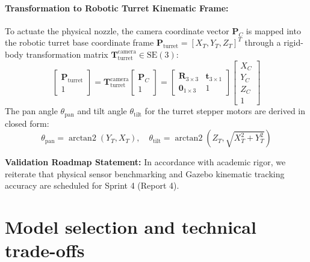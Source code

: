 \documentclass[12pt,a4paper]{article}
\begin{document}
\paragraph{Transformation to Robotic Turret Kinematic Frame:}
To actuate the physical nozzle, the camera coordinate vector $\mathbf{P}_C$ is mapped into the robotic turret base coordinate frame $\mathbf{P}_{\text{turret}} = [X_T, Y_T, Z_T]^T$ through a rigid-body transformation matrix $\mathbf{T}_{\text{turret}}^{\text{camera}} \in \mathrm{SE}(3)$:
\begin{equation}
\begin{bmatrix} \mathbf{P}_{\text{turret}} \\ 1 \end{bmatrix} = \mathbf{T}_{\text{turret}}^{\text{camera}} \begin{bmatrix} \mathbf{P}_C \\ 1 \end{bmatrix} = \begin{bmatrix} \mathbf{R}_{3 \times 3} & \mathbf{t}_{3 \times 1} \\ \mathbf{0}_{1 \times 3} & 1 \end{bmatrix} \begin{bmatrix} X_C \\ Y_C \\ Z_C \\ 1 \end{bmatrix}
\end{equation}
The pan angle $\theta_{\text{pan}}$ and tilt angle $\theta_{\text{tilt}}$ for the turret stepper motors are derived in closed form:
\begin{equation}
\theta_{\text{pan}} = \operatorname{arctan2}(Y_T, X_T), \quad \theta_{\text{tilt}} = \operatorname{arctan2}\left(Z_T, \sqrt{X_T^2 + Y_T^2}\right)
\end{equation}

\noindent\textbf{Validation Roadmap Statement:}
In accordance with academic rigor, we reiterate that physical sensor benchmarking and Gazebo kinematic tracking accuracy are scheduled for Sprint 4 (Report 4).

\section{Model selection and technical trade-offs}
\end{document}
